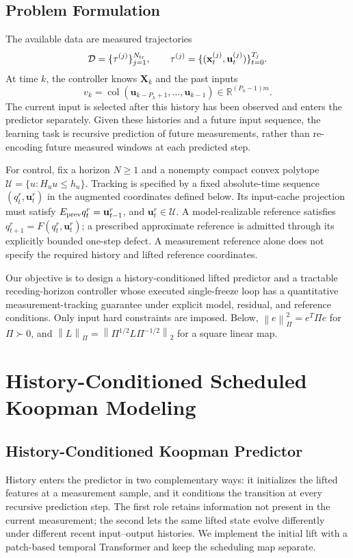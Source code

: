 \documentclass[journal]{IEEEtran}
\newcommand{\vx}{\mathbf{x}}
\newcommand{\vu}{\mathbf{u}}
\newcommand{\mX}{\mathbf{X}}
\newcommand{\R}{\mathbb{R}}
\newcommand{\norm}[1]{\left\lVert #1\right\rVert}
\newcommand{\col}{\operatorname{col}}
\begin{document}
\subsection{Problem Formulation}
\label{sec:problem}
The available data are measured trajectories
\begin{equation}
\mathcal D=\{\tau^{(j)}\}_{j=1}^{N_{\rm tr}},\qquad
\tau^{(j)}=\{(\vx_t^{(j)},\vu_t^{(j)})\}_{t=0}^{T_j}.
\label{eq:trajectory_dataset}
\end{equation}
At time $k$, the controller knows $\mX_k$ and the past inputs
\begin{equation}
v_k=\col(\vu_{k-P_h+1},\ldots,\vu_{k-1})\in\R^{(P_h-1)m}.
\label{eq:history_windows}
\end{equation}
The current input is selected after this history has been observed and enters the predictor separately. Given these histories and a future input sequence, the learning task is recursive prediction of future measurements, rather than re-encoding future measured windows at each predicted step.

For control, fix a horizon $N\ge1$ and a nonempty compact convex polytope $\mathcal U=\{u:H_u u\le h_u\}$. Tracking is specified by a fixed absolute-time sequence $(q_t^r,\vu_t^r)$ in the augmented coordinates defined below. Its input-cache projection must satisfy $E_{\rm prev}q_t^r=\vu_{t-1}^r$, and $\vu_t^r\in\mathcal U$. A model-realizable reference satisfies $q_{t+1}^r=F(q_t^r,\vu_t^r)$; a prescribed approximate reference is admitted through its explicitly bounded one-step defect. A measurement reference alone does not specify the required history and lifted reference coordinates.

Our objective is to design a history-conditioned lifted predictor and a tractable receding-horizon controller whose executed single-freeze loop has a quantitative measurement-tracking guarantee under explicit model, residual, and reference conditions. Only input hard constraints are imposed. Below, $\norm{e}_\Pi^2=e^T\Pi e$ for $\Pi\succ0$, and $\norm{L}_\Pi=\norm{\Pi^{1/2}L\Pi^{-1/2}}_2$ for a square linear map.

\section{History-Conditioned Scheduled Koopman Modeling}
\label{sec:model}
\subsection{History-Conditioned Koopman Predictor}
\label{sec:temporal_lifting}
History enters the predictor in two complementary ways: it initializes the lifted features at a measurement sample, and it conditions the transition at every recursive prediction step. The first role retains information not present in the current measurement; the second lets the same lifted state evolve differently under different recent input--output histories. We implement the initial lift with a patch-based temporal Transformer and keep the scheduling map separate.
\end{document}
